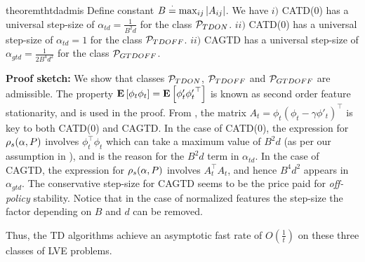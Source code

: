 \begin{restatable}{theorem}{thtdadmis}\label{th:tdadmis}
Define constant $B\eqdef\max_{ij}\md{A_{ij}}$.  We have 
$i)$ CATD(0) has a universal step-size of $\alpha_{td}=\frac{1}{B^2d}$ for  the class $\P_{TDON}$.
$ii)$ CATD(0) has a universal step-size of $\alpha_{td}=1$ for  the class $\P_{TDOFF}$.
$ii)$ CAGTD has a universal step-size of $\alpha_{gtd}=\frac{1}{2B^4d^2}$ for the class $\P_{GTDOFF}$.
\end{restatable}
\textbf{Proof sketch:} We show that classes $\P_{TDON}$, $\P_{TDOFF}$ and $\P_{GTDOFF}$ are admissible. The property $\EE{\phi_t\phi_t}=\EE{\phi'_t{\phi'_t}^\top}$ is known as second order feature stationarity, and is used in the proof.
 From , the matrix $A_t=\phi_t(\phi_t-\gamma\phi'_t)^\top$ is key to both CATD(0) and CAGTD. In the case of CATD(0),  the expression for $\rhos{P}$ involves $\phi^\top_t\phi_t$ which can take a maximum value of $B^2d$ (as per our assumption in ), and is the reason for the $B^2d$ term in $\alpha_{td}$. In the case of CAGTD, the expression for $\rhos{P}$ involves $A_t^\top A_t$, and hence $B^4d^2$ appears in $\alpha_{gtd}$. The conservative step-size for CAGTD seems to be the price paid for \emph{off-policy} stability. Notice that in the case of normalized features the step-size the factor depending on $B$ and $d$ can be removed.

Thus, the TD algorithms achieve an asymptotic fast rate of $O(\frac{1}{t})$ on these three classes of LVE problems.

